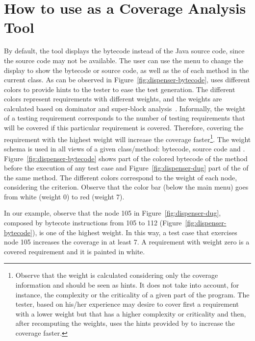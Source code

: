 
\section{How to use \toolname as a Coverage Analysis
Tool}\label{sec:coverage}

By default, the tool displays the bytecode instead of the Java
source code, since the source code may not be available. The user
can use the  menu to change the display to show
the bytecode or source code, as well as the \DUG of each method in
the current class.  As can be observed in
Figure~\ref{fig:dispenser-bytecode}, \toolname uses different
colors to provide hints to the tester to ease the test generation.
The different colors represent requirements with different
weights, and the weights are calculated based on dominator and
super-block analysis~\cite{Agrawal94DSBP}. Informally, the weight
of a testing requirement corresponds to the number of testing
requirements that will be covered if this particular requirement
is covered. Therefore, covering the requirement with the highest
weight will increase the coverage faster\footnote{Observe that the
weight is calculated
        considering only the coverage information
        and should be seen as hints. It does not
        take into account, for instance, the complexity or
        the criticality of a given part of the program. The tester, based on
        his/her experience may desire to cover first a requirement with a
        lower weight but that has a higher complexity or criticality and then,
        after recomputing the weights, uses the hints provided by \toolname to
        increase the coverage faster.}.
The weight schema is used in all views of a given class/method:
bytecode, source code and \DUG.
Figure~\ref{fig:dispenser-bytecode} shows part of the colored
bytecode of the  method before the
execution of any test case and Figure~\ref{fig:dispenser-dug} part
of the \DUG of the same method. The different colors correspond to
the weight of each node, considering the 
criterion. Observe that the color bar (below the main menu) goes
from white (weight 0) to red (weight 7).

In our example, observe that the node 105 in
Figure~\ref{fig:dispenser-dug}, composed by bytecote instructions
from 105 to 112 (Figure~\ref{fig:dispenser-bytecode}), is one of
the highest weight. In this way, a test case that exercises node
105 increases the coverage in at least 7. A requirement with
weight zero is a covered requirement and it is painted in white.

